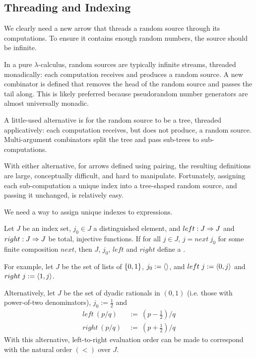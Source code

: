 \documentclass[preprint]{sigplanconf}
\begin{document}
\subsection{Threading and Indexing}

We clearly need a new arrow that threads a random source through its computations.
To ensure it contains enough random numbers, the source should be infinite.

In a pure $\lambda$-calculus, random sources are typically infinite streams, threaded monadically: each computation receives and produces a random source.
A new combinator is defined that removes the head of the random source and passes the tail along.
This is likely preferred because pseudorandom number generators are almost universally monadic.

A little-used alternative is for the random source to be a tree, threaded applicatively:
each computation receives, but does not produce, a random source.
Multi-argument combinators split the tree and pass sub-trees to sub-computations.

With either alternative, for arrows defined using pairing, the resulting definitions are large, conceptually difficult, and hard to manipulate.
Fortunately, assigning each sub-computation a unique index into a tree-shaped random source, and passing it unchanged, is relatively easy.

We need a way to assign unique indexes to expressions.

\begin{definition}
Let $J$ be an index set, $j_0 \in J$ a distinguished element, and $left : J \Rightarrow J$ and $right : J \Rightarrow J$ be total, injective functions. If for all $j \in J$, $j = next~j_0$ for some finite composition $next$, then $J$, $j_0$, $left$ and $right$ define a .
\end{definition}

For example, let $J$ be the set of lists of $\{{0,1}\}$, $j_0 := \langle{}\rangle$, and $left~j := \langle{0,j}\rangle$ and $right~j := \langle{1,j}\rangle$.

Alternatively, let $J$ be the set of dyadic rationals in $(0,1)$ (i.e. those with power-of-two denominators), $j_0 := \tfrac{1}{2}$ and
\begin{equation}
\begin{aligned}
	left~(p/q) &\ := \ (p-\tfrac{1}{2})/q
\\
	right~(p/q) &\ := \ (p+\tfrac{1}{2})/q
\end{aligned}
\end{equation}
With this alternative, left-to-right evaluation order can be made to correspond with the natural order $(<)$ over $J$.
\end{document}
